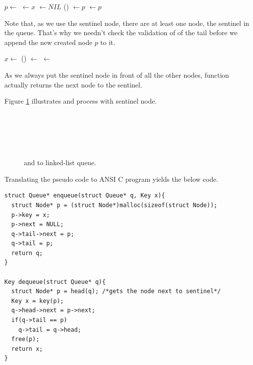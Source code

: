 \documentclass{article}
\begin{document}
\begin{algorithmic}
  \State $p \gets $ 
  \State {} $\gets x$
  \State {} $\gets NIL$
  \State {}() $\gets p$
  \State {} $\gets p$
\EndFunction
\end{algorithmic}

Note that, as we use the sentinel node, there are at least one node, the
sentinel in the queue. That's why we needn't check the validation of
of the tail before we append the new created node $p$ to it.

\begin{algorithmic}
  \State $x \gets $ 
  \State {}() $\gets$ 
   
    \State {} $\gets$ 
  \EndIf
  \State \Return {}
\EndFunction
\end{algorithmic}

As we always put the sentinel node in front of all the other nodes,
function  actually returns the next node to the sentinel.

Figure \ref{fig:list-queue} illustrates  and  process with sentinel node.

\begin{figure}[htbp]
 \centering
  \\
  \\
  \\
  \\
 \caption{ and  to linked-list queue.} \label{fig:list-queue}
\end{figure}

Translating the pseudo code to ANSI C program yields the below code.

\begin{lstlisting}
struct Queue* enqueue(struct Queue* q, Key x){
  struct Node* p = (struct Node*)malloc(sizeof(struct Node));
  p->key = x;
  p->next = NULL;
  q->tail->next = p;
  q->tail = p;
  return q;
}

Key dequeue(struct Queue* q){
  struct Node* p = head(q); /*gets the node next to sentinel*/
  Key x = key(p);
  q->head->next = p->next;
  if(q->tail == p)
    q->tail = q->head;
  free(p);
  return x;
}
\end{lstlisting}
\end{document}
